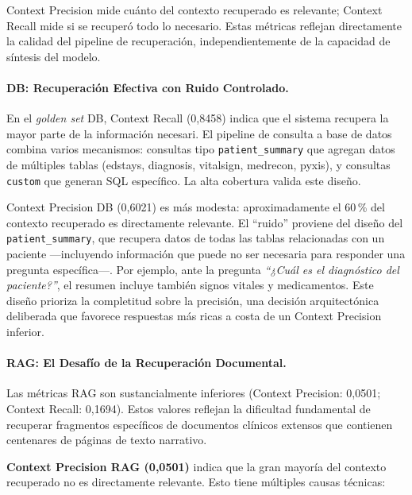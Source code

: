 Context Precision mide cuánto del contexto recuperado es relevante; Context Recall mide si se recuperó todo lo necesario. Estas métricas reflejan directamente la calidad del pipeline de recuperación, independientemente de la capacidad de síntesis del modelo.

\paragraph{DB: Recuperación Efectiva con Ruido Controlado.}

En el \textit{golden set} DB, Context Recall (0,8458) indica que el sistema recupera la mayor parte de la información necesari. El pipeline de consulta a base de datos combina varios mecanismos: consultas tipo \texttt{patient\_summary} que agregan datos de múltiples tablas (edstays, diagnosis, vitalsign, medrecon, pyxis), y consultas \texttt{custom} que generan \ac{SQL} específico. La alta cobertura valida este diseño.

Context Precision DB (0,6021) es más modesta: aproximadamente el 60\,\% del contexto recuperado es directamente relevante. El ``ruido'' proviene del diseño del \texttt{patient\_summary}, que recupera datos de todas las tablas relacionadas con un paciente ---incluyendo información que puede no ser necesaria para responder una pregunta específica---. Por ejemplo, ante la pregunta \textit{``¿Cuál es el diagnóstico del paciente?''}, el resumen incluye también signos vitales y medicamentos. Este diseño prioriza la completitud sobre la precisión, una decisión arquitectónica deliberada que favorece respuestas más ricas a costa de un Context Precision inferior.

\paragraph{RAG: El Desafío de la Recuperación Documental.}

Las métricas \ac{RAG} son sustancialmente inferiores (Context Precision: 0,0501; Context Recall: 0,1694). Estos valores reflejan la dificultad fundamental de recuperar fragmentos específicos de documentos clínicos extensos que contienen centenares de páginas de texto narrativo.

\textbf{Context Precision \ac{RAG} (0,0501)} indica que la gran mayoría del contexto recuperado no es directamente relevante. Esto tiene múltiples causas técnicas:


